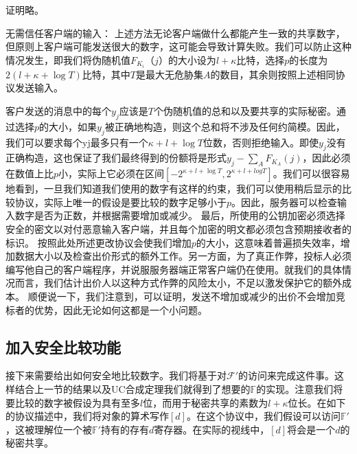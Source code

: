 证明略。
\newline

{\heiti 无需信任客户端的输入：} 上述方法无论客户端做什么都能产生一致的共享数字，但原则上客户端可能发送很大的数字，这可能会导致计算失败。我们可以防止这种情况发生，即我们将伪随机值$F_{K_i}（j）$的大小设为$l+\kappa$比特，选择$p$的长度为$2(l+\kappa+\log T)$比特，其中$T$是最大无危胁集$A$的数目，其余则按照上述相同协议发送输入。

客户发送的消息中的每个$y_j$应该是$T$个伪随机值的总和以及要共享的实际秘密。通过选择$p$的大小，如果$y_j$被正确地构造，则这个总和将不涉及任何约简模。因此，我们可以要求每个yj最多只有一个$\kappa+l+\log T$位数，否则拒绝输入。即使$y_j$没有正确构造，这也保证了我们最终得到的份额将是形式$y_j-\sum_{A}F_{K_A}(j)$，因此必须在数值上比$p$小，实际上它必须在区间$[-2^{\kappa+l+\log T},2^{\kappa+l+log T}]$。我们可以很容易地看到，一旦我们知道我们使用的数字有这样的约束，我们可以使用稍后显示的比较协议，实际上唯一的假设是要比较的数字足够小于$p$。因此，服务器可以检查输入数字是否为正数，并根据需要增加或减少。
最后，所使用的公钥加密必须选择安全的密文以对付恶意输入客户端，并且每个加密的明文都必须包含预期接收者的标识。
按照此处所述更改协议会使我们增加$p$的大小，这意味着普遍损失效率，增加数据大小以及检查出价形式的额外工作。另一方面，为了真正作弊，投标人必须编写他自己的客户端程序，并说服服务器端正常客户端仍在使用。就我们的具体情况而言，我们估计出价人以这种方式作弊的风险太小，不足以激发保护它的额外成本。
顺便说一下，我们注意到，可以证明，发送不增加或减少的出价不会增加竞标者的优势，因此无论如何这都是一个小问题。

\subsection{加入安全比较功能}
接下来需要给出如何安全地比较数字。我们将基于对$\mathcal{F}'$的访问来完成这件事。这样结合上一节的结果以及UC合成定理我们就得到了想要的$\mathbb{F}$的实现。注意我们将要比较的数字被假设为具有至多$l$位，而用于秘密共享的素数为$l+\kappa$位长。在如下的协议描述中，我们将对象的算术写作$[d]$。在这个协议中，我们假设可以访问$\mathbb{F}'$，这被理解位一个被$\mathbb{F}'$持有的存有$d$寄存器。在实际的视线中，$[d]$将会是一个$d$的秘密共享。

